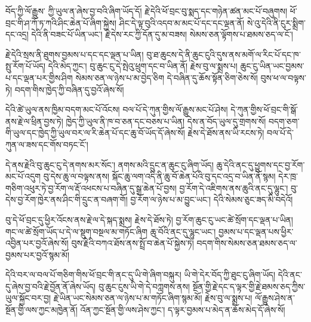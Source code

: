 \documentclass[12pt]{nextbook}
\begin{document}
\begin{readersection}{བོད་ཀྱི་ལོ་རྒྱུས་}
ཀྱི་ཡུལ་ན་ཞེས་བྱ་བའི་ཞིག་ཡོད་དོ། རྗེ་དེའི་ཕོ་བྲང་བུ་སྨད་དང་གཉེན་ཚན་མང་པོ་བཞུགས། ཕོ་བྲང་གི་ཤ་ཀོ་ཏ་ཀའི་ཤིང་ཆེན་པོ་ཞིག་སྐྱེས། ཤིང་དེ་ལྟ་བུའི་འདབ་མ་མང་པོ་དང་དང་ལྡན་ནོ། སེ་འུ་དེའི་ནི་ངུར་སྨྲིག་དང་འདྲ། དེའི་ནི་བཟང་པོ་ཡིན་ཡང་། རྗེ་དེས་རང་ཀྱི་དོན་དུ་མ་བཟས། སེམས་ཅན་ལྟོགས་པ་ཐམས་ཅད་ལ་ངོ་།

རྗེ་དེའི་སྲས་ནི་ཐུགས་བྱམས་པ་དང་དང་ལྡན་པ་ཡིན། བུ་ཐ་ཆུངས་དེ་ནི་ཆུང་ངུའི་དུས་ནས་མགོ་ལ་རིང་པོ་དང་ཁ་སྤུ་རོག་པོ་ཡོད། དེའི་མེད་ཀྱང་། བུ་ཆུང་ངུ་དེ་སྤེའུ་ཕྲུག་དང་བ་ཡིན་ནོ། རྗེས་བུ་ལ་སྨྲས་པ། ཆུང་ངུ་ཡིན་ཡང་བྱམས་པ་དང་ལྡན་པར་གྱིས་ཤིག སེམས་ཅན་ལ་ཉེས་པ་མ་བྱེད་ཅིག དེ་བཞིན་དུ་ཆོས་སྟོན་ཅིག་ཅེས་སོ། བུས་ཕ་ལ་བལྟས་ཏེ། བདག་གིས་ཁྱེད་ཀྱི་བཞིན་དུ་བྱའོ་ཞེས་སོ།

དེའི་ཚེ་ཡུལ་ནས་ཁྱིམ་བདག་མང་པོ་འོངས། བལ་པོ་དེ་ཀུན་གྱིས་ལོ་རྒྱུས་མང་པོ་ཤེས། དེ་ཀུན་གྱིས་ཕོ་བྲང་གི་སྒོ་ནས་རྗེ་ལ་ཕྲིན་བྱས་ཏེ། ཁྱེད་ཀྱི་ཡུལ་ནི་ཁ་བ་ཅན་དང་བཅས་པ་ཡིན། དེས་ན་བོད་ཡུལ་དུ་གྲགས་སོ། བདག་ཅག་གི་ཡུལ་དང་ཁྱེད་ཀྱི་ཡུལ་བར་ལ་རི་ཆེན་པོ་དང་ཆུ་བོ་ཡོད་དོ་ཞེས་སོ། རྗེས་དེ་ཐོས་ནས་ཡི་རངས་ཏེ། བལ་པོ་དེ་ཀུན་ལ་ཟས་དང་གོས་བཏང་ངོ་།

དེ་ནས་རྗེའི་བུ་ཆུང་ངུ་དེ་ནགས་མར་སོང་། ནགས་མའི་དྲུང་ན་ཆུང་ངུ་ཞིག་ཡོད། ཆུ་དེའི་ནང་དུ་ཕྱུགས་དང་བྱ་རོག་མང་པོ་འདུག བུ་དེས་ཆུ་ལ་བལྟས་ནས། སྐོང་ཆུ་ལག་འདི་ནི་ཆུ་བོ་ཆེན་པོའི་བུ་དང་འདྲ་བ་ཡིན་ནོ་སྙམ། དེར་ཁྲ་གཅིག་འཕུར་ཏེ་བྱ་རོག་ལ་རྡོ་འཕངས་པ་བཞིན་དུ་སྒྲ་ཆེན་པོ་བྱས། བྱ་རོག་དེ་འཇིགས་ནས་ཆུའི་ནང་དུ་ལྷུང་། བུ་དེས་བྱ་རོག་ཁྱེར་ནས་ཤིང་གི་དྲུང་ན་བཞག་གོ། བྱ་རོག་ལ་ཉེས་པ་མ་བྱུང་ཡང་། དེའི་སེམས་ཅུང་ཟད་མི་བདེའོ།

བུ་དེ་ཕོ་བྲང་དུ་ཕྱིར་འོངས་ནས་རྗེ་ལ་དེ་སྐད་སྨྲས། རྗེས་དེ་ཐོས་ཏེ། བྱ་རོག་ཆུང་ངུ་ཡང་ཚེ་སྲོག་དང་ལྡན་པ་ཡིན། གང་ལ་ཚེ་སྲོག་ཡོད་པ་དེ་ལ་སྡུག་བསྔལ་མ་གཏོང་ཞིག ཆུ་བོའི་ནང་དུ་ལྷུང་ཡང་། བྱམས་པ་དང་ལྡན་པས་ཕྱིར་འབྱིན་པར་བྱའོ་ཞེས་སོ། བུས་རྗེའི་བཀའ་ཐོས་ནས་སྤྲོ་བ་ཆེན་པོ་སྐྱེས་ཏེ། བདག་གིས་སེམས་ཅན་ཐམས་ཅད་ལ་བྱམས་པར་བྱའོ་སྙམ་མོ།

དེའི་བར་ལ་བལ་པོ་གཅིག་གིས་ཕོ་བྲང་གི་ནང་དུ་ཡི་གེ་ཞིག་བསྐུར། ཡི་གེ་དེར་བོད་ཀྱི་ཐུང་ངུ་ཞིག་ཡོད། དེའི་ནང་དུ་ཞེས་བྱ་བའི་རྗེ་བྱོན་ནོ་ཞེས་ཡོད། བུ་ཆུང་ངུས་ཡི་གེ་དེ་བཀླགས་ནས། སྔོན་གྱི་རྗེ་དང་ད་ལྟར་གྱི་རྗེ་ཐམས་ཅད་ཀྱིས་ཡུལ་སྐྱོང་བར་བྱ། རྗེ་ཡིན་ཡང་སེམས་ཅན་ལ་ཉེས་པ་མ་གཏོང་ཞིག་སྙམ་མོ། རྗེས་བུ་ལ་སྨྲས་པ། ལོ་རྒྱུས་ཤེས་ན་སྔོན་གྱི་ལས་ཀྱང་མཁྱེན་ནོ། འོན་ཀྱང་སྔོན་གྱི་ལས་ཤེས་ཀྱང་། ད་ལྟར་བྱམས་པ་མེད་ན་ཆོས་མེད་དོ་ཞེས་སོ།


\end{readersection}
\end{document}
